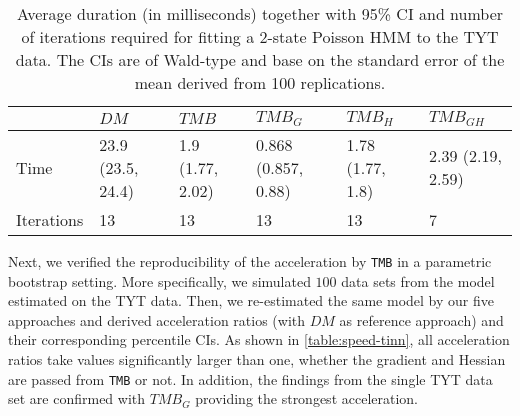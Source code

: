 \documentclass[bimj,fleqn]{w-art}\usepackage[]{graphicx}\usepackage[]{color}
\theoremstyle{plain}
\theoremstyle{definition}
\begin{document}
\begin{table}[ht]
\centering
\begin{tabular}{llllll}
  \hline
 & \textit{${DM}$} & \textit{${TMB}$} & \textit{${TMB_G}$} & \textit{${TMB_H}$} & \textit{${TMB_{GH}}$} \\ 
  \hline
Time & 23.9 (23.5, 24.4) & 1.9 (1.77, 2.02) & 0.868 (0.857, 0.88) & 1.78 (1.77, 1.8) & 2.39 (2.19, 2.59) \\ 
  Iterations & 13 & 13 & 13 & 13 & 7 \\ 
   \hline
\end{tabular}
\caption{Average duration (in milliseconds) together with 95\% CI and number of iterations required for fitting a 2-state Poisson HMM to the TYT data. The CIs are of Wald-type and base on the standard error of the mean derived from 100 replications.} 
\label{table:speed-consistency-tinn}
\end{table}







% 

Next, we verified the reproducibility of the acceleration by {\tt{TMB}} in a parametric bootstrap setting. More specifically, we simulated $100$ data sets from the model estimated on the TYT data. Then, we re-estimated the same model by our five approaches and derived acceleration ratios (with $DM$ as reference approach) and their corresponding percentile CIs. As shown in \autoref{table:speed-tinn},  all acceleration ratios take values significantly larger than one, whether the gradient and Hessian are passed from {\tt{TMB}} or not. In addition, the findings from the single TYT data set are confirmed with $TMB_G$ providing the strongest acceleration.    
\end{document}
